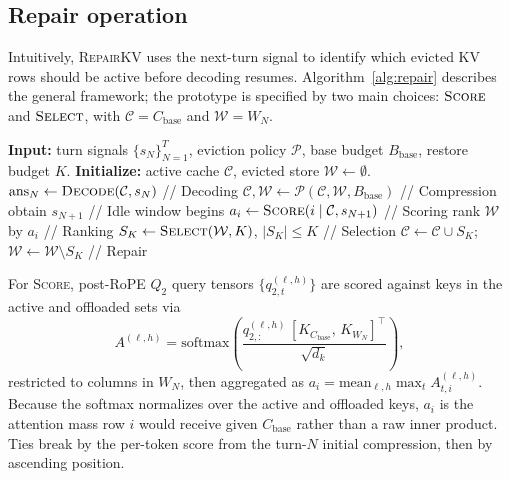 \documentclass{article}
\newcommand{\repairkv}{\textsc{RepairKV}}
\newcommand{\bbase}{\ensuremath{B_{\mathrm{base}}}}
\begin{document}
\subsection{Repair operation}
Intuitively, \repairkv{} {\color{red}uses the next-turn signal to identify which evicted KV rows should be active before decoding resumes.} Algorithm~\ref{alg:repair} describes the general framework; the prototype is specified by two main choices: {\color{red}$\textsc{Score}$ and $\textsc{Select}$, with $\mathcal{C}=C_{\mathrm{base}}$ and $\mathcal{W}=W_N$.}
\begin{algorithm}[t]
\caption{General \repairkv{} Execution Framework}
\label{alg:repair}
\begin{algorithmic}[1]
\STATE \textbf{Input:} turn signals $\{s_N\}_{N=1}^T$,
eviction policy $\mathcal{P}$, base budget $\bbase$, restore
budget $K$.
\STATE \textbf{Initialize:} active cache $\mathcal{C}$,
evicted store $\mathcal{W}\!\gets\!\emptyset$.
  \STATE $\mathrm{ans}_N \gets \textsc{Decode}(\mathcal{C}, s_N)$ \hfill // Decoding
  \STATE $\mathcal{C}, \mathcal{W} \gets \mathcal{P}(\mathcal{C}, \mathcal{W}, \bbase)$ \hfill // Compression
  \STATE obtain $s_{N+1}$ \hfill // Idle window begins
    \STATE $a_i \gets \textsc{Score}(i \mid \mathcal{C}, s_{N+1})$ \hfill // Scoring
  \ENDFOR
  \STATE rank $\mathcal{W}$ by $a_i$ \hfill // Ranking
  \STATE $S_K \gets \textsc{Select}(\mathcal{W}, K)$, $|S_K|\!\le\!K$ \hfill // Selection
  \STATE $\mathcal{C} \gets \mathcal{C}\!\cup\!S_K$;\, $\mathcal{W} \gets \mathcal{W}\!\setminus\!S_K$ \hfill // Repair
\ENDFOR
\end{algorithmic}
\end{algorithm}

For \textsc{Score}, post-RoPE $Q_2$ query tensors
$\{q^{(\ell,h)}_{2,t}\}$ are {\color{red}scored} against keys in the active and
offloaded sets via
\begin{equation}
  A^{(\ell,h)} = \mathrm{softmax}\!\left(
    \frac{q^{(\ell,h)}_{2,:}\, [K_{C_{\mathrm{base}}},\, K_{W_N}]^{\top}}
         {\sqrt{d_k}}
  \right),
  \label{eq:score-attn}
\end{equation}
restricted to columns in $W_N$, then aggregated as
$a_i = \mathrm{mean}_{\ell, h} \max_t A^{(\ell,h)}_{t,i}$.
Because the softmax normalizes over the active and offloaded keys,
$a_i$ is the attention mass row $i$ would receive given
$C_{\mathrm{base}}$ rather than a raw inner product. Ties break
by the per-token score from the turn-$N$ initial compression, then
by ascending position.
\end{document}
